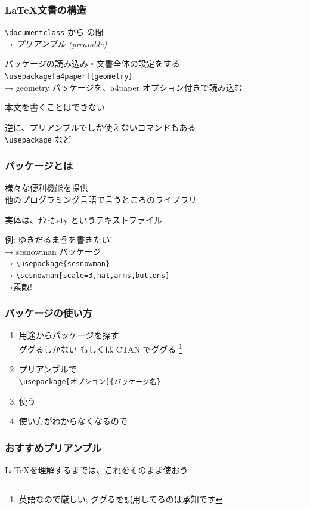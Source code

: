 \begin{frame}[fragile]
	\frametitle{\LaTeX 文書の構造}
	\verb+\documentclass+ から \verb++ の間\\
	→ \emph{プリアンブル (preamble)}
	
	パッケージの読み込み・文書全体の設定をする\\
	{\footnotesize\verb+\usepackage[a4paper]{geometry}+\\
	→ geometry パッケージを、a4paper オプション付きで読み込む}
	
	本文を書くことはできない
	
	逆に、プリアンブルでしか使えないコマンドもある\\
	{\footnotesize \verb+\usepackage+ など}
\end{frame}

\begin{frame}[fragile]
	\frametitle{パッケージとは}
	様々な便利機能を提供\\
	{\footnotesize 他のプログラミング言語で言うところのライブラリ}
	
	実体は、ﾅﾝﾄｶ.sty というテキストファイル
	
	例: ゆきだるま☃を書きたい!\\
	→ scsnowman パッケージ\\
	→ \verb+\usepackage{scsnowman}+ \\
	→ \verb+\scsnowman[scale=3,hat,arms,buttons]+ \\
	→\scsnowman[scale=3,hat,arms,buttons] 素敵!
\end{frame}

\begin{frame}[fragile]
	\frametitle{パッケージの使い方}
	\begin{enumerate}
		\item 用途からパッケージを探す\\
			{\footnotesize ググるしかない もしくは CTAN でググる
			\footnote{英語なので厳しい; {\tiny ググるを誤用してるのは承知です}}}
		\item プリアンブルで\\\verb+\usepackage[オプション]{パッケージ名}+
		\item 使う
		\item 使い方がわからなくなるので 
	\end{enumerate}
\end{frame}

\begin{frame}[fragile]
	\frametitle{おすすめプリアンブル}
	
	
	\LaTeX を理解するまでは、これをそのまま使おう
\end{frame}

